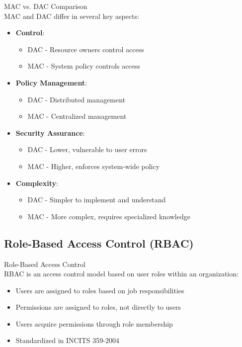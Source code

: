 \begin{theorem}{MAC vs. DAC Comparison}\\
MAC and DAC differ in several key aspects:
\begin{itemize}
    \item \textbf{Control}:
    \begin{itemize}
        \item DAC - Resource owners control access
        \item MAC - System policy controls access
    \end{itemize}
    \item \textbf{Policy Management}:
    \begin{itemize}
        \item DAC - Distributed management
        \item MAC - Centralized management
    \end{itemize}
    \item \textbf{Security Assurance}:
    \begin{itemize}
        \item DAC - Lower, vulnerable to user errors
        \item MAC - Higher, enforces system-wide policy
    \end{itemize}
    \item \textbf{Complexity}:
    \begin{itemize}
        \item DAC - Simpler to implement and understand
        \item MAC - More complex, requires specialized knowledge
    \end{itemize}
\end{itemize}
\end{theorem}

\subsection{Role-Based Access Control (RBAC)}

\begin{definition}{Role-Based Access Control}\\
RBAC is an access control model based on user roles within an organization:
\begin{itemize}
    \item Users are assigned to roles based on job responsibilities
    \item Permissions are assigned to roles, not directly to users
    \item Users acquire permissions through role membership
    \item Standardized in INCITS 359-2004
\end{itemize}
\end{definition}


